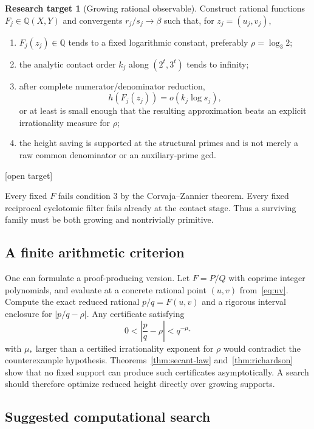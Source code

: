 \documentclass[11pt,oneside]{article}
\theoremstyle{definition}
\newtheorem{target}[theorem]{Research target}
\theoremstyle{remark}
\newcommand{\Q}{\mathbb Q}
\newcommand{\openstatus}{\textcolor{deepred}{\textsf{[open target]}}}
\begin{document}
\begin{target}[Growing rational observable]
\label{target:growing-observable}
Construct rational functions $F_j\in\Q(X,Y)$ and convergents $r_j/s_j\to\beta$ such that,
for $z_j=(u_j,v_j)$,
\begin{enumerate}
\item $F_j(z_j)\in\Q$ tends to a fixed logarithmic constant, preferably
$\rho=\log_3 2$;
\item the analytic contact order $k_j$ along $(2^t,3^t)$ tends to infinity;
\item after complete numerator/denominator reduction,
\[
 h(F_j(z_j))=o(k_j\log s_j),
\]
or at least is small enough that the resulting approximation beats an explicit irrationality
measure for $\rho$;
\item the height saving is supported at the structural primes and is not merely a raw common
denominator or an auxiliary-prime gcd.
\end{enumerate}
\openstatus
\end{target}

Every fixed $F$ fails condition 3 by the Corvaja--Zannier theorem.  Every fixed reciprocal
cyclotomic filter fails already at the contact stage.  Thus a surviving family must be both
growing and nontrivially primitive.

\subsection{A finite arithmetic criterion}

One can formulate a proof-producing version.  Let $F=P/Q$ with coprime integer polynomials,
and evaluate at a concrete rational point $(u,v)$ from~\eqref{eq:uv}.  Compute the exact
reduced rational $p/q=F(u,v)$ and a rigorous interval enclosure for $|p/q-\rho|$.  Any
certificate satisfying
\begin{equation}
 0<\left|\frac pq-\rho\right|<q^{-\mu_*}
 \label{eq:irrationality-certificate}
\end{equation}
with $\mu_*$ larger than a certified irrationality exponent for $\rho$ would contradict the
counterexample hypothesis.  Theorems~\ref{thm:secant-law} and~\ref{thm:richardson} show that
no fixed support can produce such certificates asymptotically.  A search should therefore
optimize reduced height directly over growing supports.

\subsection{Suggested computational search}
\end{document}
